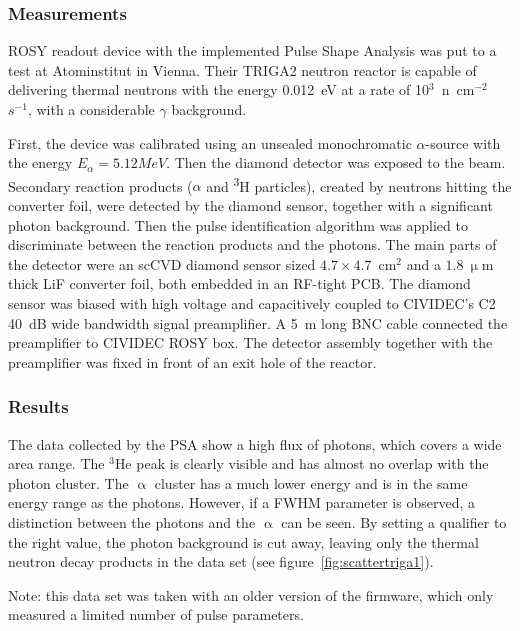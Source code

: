 \documentclass[12pt]{packages/mytustyle}  %
\begin{document}
\subsubsection{Measurements}
ROSY readout device with the implemented Pulse Shape Analysis was put to a test at Atominstitut in Vienna. Their TRIGA2 neutron reactor is capable of delivering thermal neutrons with the energy 0.012~eV at a rate of 10$^3$~n~cm$^{-2}$ $s^{-1}$, with a considerable $\gamma$ background. 

First, the device was calibrated using an unsealed monochromatic $\alpha$-source with the energy $E_\alpha=5.12MeV$. Then the diamond detector was exposed to the beam. Secondary reaction products ($\alpha$ and \textsuperscript{3}H particles), created by neutrons hitting the converter foil, were detected by the diamond sensor, together with a significant photon background. Then the pulse identification algorithm was applied to discriminate between the reaction products and the photons.
The main parts of the detector were an scCVD diamond sensor sized $4.7\times4.7$~cm$^2$ and a $1.8~\upmu$m thick LiF converter foil, both embedded in an RF-tight PCB. The diamond sensor was biased with high voltage and capacitively coupled to CIVIDEC's C2 40~dB wide bandwidth signal preamplifier. A 5~m long BNC cable connected the preamplifier to CIVIDEC ROSY box. The detector assembly together with the preamplifier was fixed in front of an exit hole of the reactor.

\subsubsection{Results}
The data collected by the PSA show a high flux of photons, which covers a wide area range. The $^3$He peak is clearly visible and has almost no overlap with the photon cluster. The $\upalpha$ cluster has a much lower energy and is in the same energy range as the photons. However, if a FWHM parameter is observed, a distinction between the photons and the $\upalpha$ can be seen. By setting a qualifier to the right value, the photon background is cut away, leaving only the thermal neutron decay products in the data set (see figure~\ref{fig:scattertriga1}).

Note: this data set was taken with an older version of the firmware, which only measured a limited number of pulse parameters.
\end{document}
